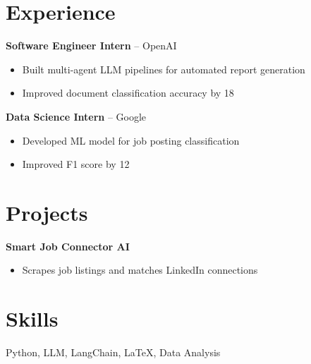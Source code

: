 \documentclass[11pt]{article}
\begin{document}
\section*{Experience}
\textbf{Software Engineer Intern} -- OpenAI 
\begin{itemize}
\item Built multi-agent LLM pipelines for automated report generation
\item Improved document classification accuracy by 18%
\end{itemize}
\textbf{Data Science Intern} -- Google 
\begin{itemize}
\item Developed ML model for job posting classification
\item Improved F1 score by 12%
\end{itemize}

\section*{Projects}
\textbf{Smart Job Connector AI} 
\begin{itemize}
\item Scrapes job listings and matches LinkedIn connections
\end{itemize}

\section*{Skills}
Python, LLM, LangChain, LaTeX, Data Analysis
\end{document}
